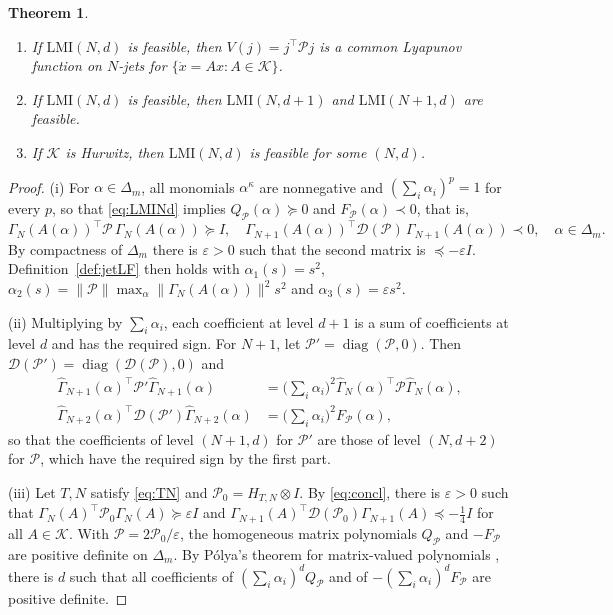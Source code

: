 \documentclass[preprint,12pt,authoryear]{elsarticle}
\newtheorem{theorem}{Theorem}
\theoremstyle{definition}
\theoremstyle{remark}
\newcommand{\tr}{^{\top}}
\newcommand{\PP}{\mathcal{P}}
\newcommand{\DD}{\mathcal{D}}
\newcommand{\KK}{\mathcal{K}}
\DeclareMathOperator{\diag}{diag}
\begin{document}
\begin{theorem}\label{thm:hier}
\begin{enumerate}[nosep,label=(\roman*)]
\item If $\mathrm{LMI}(N,d)$ is feasible, then $V(j)=j\tr\PP j$ is a common Lyapunov function on $N$-jets for $\{\dot x=Ax:A\in\KK\}$.
\item If $\mathrm{LMI}(N,d)$ is feasible, then $\mathrm{LMI}(N,d+1)$ and $\mathrm{LMI}(N+1,d)$ are feasible.
\item If $\KK$ is Hurwitz, then $\mathrm{LMI}(N,d)$ is feasible for some $(N,d)$.
\end{enumerate}
\end{theorem}
\begin{proof}
(i) For $\alpha\in\Delta_m$, all monomials $\alpha^\kappa$ are nonnegative and $(\sum_i\alpha_i)^p=1$ for every $p$, so that \eqref{eq:LMINd} implies $Q_\PP(\alpha)\succeq0$ and $F_\PP(\alpha)\prec0$, that is,
\begin{equation}
\Gamma_N(A(\alpha))\tr\PP\,\Gamma_N(A(\alpha))\succeq I,\quad\Gamma_{N+1}(A(\alpha))\tr\DD(\PP)\,\Gamma_{N+1}(A(\alpha))\prec0,\quad\alpha\in\Delta_m .
\end{equation}
By compactness of $\Delta_m$ there is $\varepsilon>0$ such that the second matrix is $\preceq-\varepsilon I$. Definition~\ref{def:jetLF} then holds with $\alpha_1(s)=s^2$, $\alpha_2(s)=\|\PP\|\max_{\alpha}\|\Gamma_N(A(\alpha))\|^2s^2$ and $\alpha_3(s)=\varepsilon s^2$.

(ii) Multiplying by $\sum_i\alpha_i$, each coefficient at level $d+1$ is a sum of coefficients at level $d$ and has the required sign. For $N+1$, let $\PP'=\diag(\PP,0)$. Then $\DD(\PP')=\diag(\DD(\PP),0)$ and
\begin{align}
\hat\Gamma_{N+1}(\alpha)\tr\PP'\hat\Gamma_{N+1}(\alpha)&=\Big(\sum_i\alpha_i\Big)^2\hat\Gamma_N(\alpha)\tr\PP\hat\Gamma_N(\alpha),\nonumber\\
\hat\Gamma_{N+2}(\alpha)\tr\DD(\PP')\hat\Gamma_{N+2}(\alpha)&=\Big(\sum_i\alpha_i\Big)^2F_\PP(\alpha),
\end{align}
so that the coefficients of level $(N+1,d)$ for $\PP'$ are those of level $(N,d+2)$ for $\PP$, which have the required sign by the first part.

(iii) Let $T,N$ satisfy \eqref{eq:TN} and $\PP_0=H_{T,N}\otimes I$. By \eqref{eq:concl}, there is $\varepsilon>0$ such that $\Gamma_N(A)\tr\PP_0\Gamma_N(A)\succeq\varepsilon I$ and $\Gamma_{N+1}(A)\tr\DD(\PP_0)\Gamma_{N+1}(A)\preceq-\frac14I$ for all $A\in\KK$. With $\PP=2\PP_0/\varepsilon$, the homogeneous matrix polynomials $Q_\PP$ and $-F_\PP$ are positive definite on $\Delta_m$. By P\'olya's theorem for matrix-valued polynomials \citep{Scherer2005,OliveiraPeres2007}, there is $d$ such that all coefficients of $(\sum_i\alpha_i)^dQ_\PP$ and of $-(\sum_i\alpha_i)^dF_\PP$ are positive definite.
\end{proof}
\end{document}
